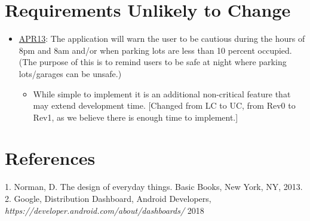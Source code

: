 \documentclass[]{article}
\begin{document}
\section{Requirements Unlikely to Change}
\begin{itemize}
    \item \hyperlink{APR13}{APR13}: The application will warn the user to be cautious during the hours of 8pm and 8am and/or when parking lots are less than 10 percent occupied. (The purpose of this is to remind users to be safe at night where parking lots/garages can be unsafe.)
    \begin{itemize}
        \item While simple to implement it is an additional non-critical feature that may extend development time. [Changed from LC to UC, from Rev0 to Rev1, as we believe there is enough time to implement.]
    \end{itemize}
\end{itemize}
\newpage
\section{References} 
1. Norman, D. The design of everyday things. Basic Books, New York, NY, 2013.\\
2. Google, Distribution Dashboard, Android Developers, \textit{https://developer.android.com/about/dashboards/} 2018
\end{document}
